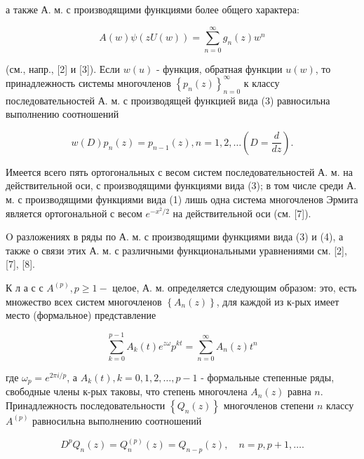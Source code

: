 \documentclass[10pt]{article}
\begin{document}
а также А. м. с производящими функциями более общего характера:



\[

A(w) \psi(z U(w))=\sum_{n=0}^{\infty} g_{n}(z) w^{n}

\]



(см., напр., [2] и [3]). Если $w(u)$ - функция, обратная функции $u(w)$, то принадлежность системы многочленов $\left\{p_{n}(z)\right\}_{n=0}^{\infty}$ к классу последовательностей А. м. с производящей функцией вида (3) равносильна выполнению соотношений



\[

w(D) p_{n}(z)=p_{n-1}(z), n=1,2, \ldots\left(D=\frac{d}{d z}\right) .

\]



Имеется всего пять ортогональных с весом систем последовательностей А. м. на действительной оси, с производящими функциями вида (3); в том числе среди А. м. с производящими функциями вида (1) лишь одна система многочленов Эрмита является ортогональной с весом $e^{-x^{2} / 2}$ на действительной оси (см. [7]).



$\mathrm{O}$ разложениях в ряды по А. м. с производящими функциями вида (3) и (4), а также о связи этих А. м. с различными функциональными уравнениями см. [2], [7], [8].



К л а с с $A^{(p)}, p \geqslant 1-$ целое, А. м. определяется следующим образом: это, есть множество всех систем многочленов $\left\{A_{n}(z)\right\}$, для каждой из к-рых имеет место (формальное) представление



\[

\sum_{k=0}^{p-1} A_{k}(t) e^{z \omega} p^{k t}=\sum_{n=0}^{\infty} A_{n}(z) t^{n}

\]



где $\omega_{p}=e^{2 \pi i / p}$, а $A_{k}(t), k=0,1,2, \ldots, p-1$ - формальные степенные ряды, свободные члены к-рых таковы, что степень многочлена $A_{n}(z)$ равна $n$. Принадлежность последовательности $\left\{Q_{n}(z)\right\}$ многочленов степени $n$ классу $A^{(p)}$ равносильна выполнению соотношений



\[

D^{p} Q_{n}(z)=Q_{n}^{(p)}(z)=Q_{n-p}(z), \quad n=p, p+1, \ldots .

\]
\end{document}
